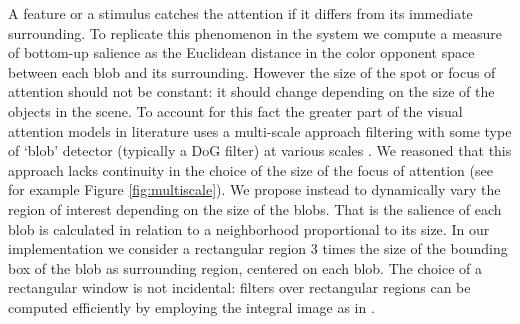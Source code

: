 \documentclass{llncs}
\begin{document}
A feature or a stimulus
catches the attention if it differs from its
immediate surrounding. To replicate this phenomenon in the system
we compute a measure of bottom-up salience as the Euclidean distance in the
color opponent space between each blob and its
surrounding. However the size of the spot or focus of attention
should not be constant: it should change depending on the size of the
objects in the scene. To account for this fact the greater
part of the visual attention models in literature uses a
multi-scale approach filtering with some type of `blob'
detector (typically a DoG filter) at
various scales \cite{IttiK01}. We reasoned that this approach
lacks continuity in the choice of the size of the focus of
attention (see for example Figure \ref{fig:multiscale}).
We propose instead to dynamically vary the
region of interest depending on the size of the blobs.
That is the salience of each blob is calculated in
relation to a neighborhood proportional to its size. In
our implementation we consider a rectangular region 3
times the size of the bounding box of the blob as
surrounding region, centered on each blob. The choice
of a rectangular window is not incidental: filters
over rectangular regions can be
computed efficiently by employing the integral image
as in \cite{ViolaJ04}.
\end{document}
